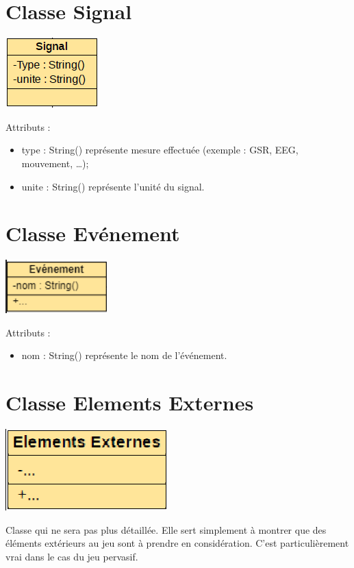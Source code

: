 \documentclass{article}
\begin{document}
	\section{Classe Signal}
		\begin{center}
			\includegraphics[scale=0.5]{include/Classe_Signal.PNG}\newline
		\end{center}
		Attributs :
		\begin{itemize}
			\item type : String() représente mesure effectuée (exemple : GSR, EEG, mouvement, …);
			\item unite : String() représente l’unité du signal.
		\end{itemize}

	\section{Classe Evénement}
		\begin{center}
			\includegraphics[scale=0.5]{include/Classe_Evenement.PNG}
		\end{center}
		Attributs :
		\begin{itemize}
			\item nom : String() représente le nom de l'événement.
		\end{itemize}

	\section{Classe Elements Externes}
		\begin{center}
			\includegraphics[scale=0.5]{include/Classe_Elements_Externes.PNG}\newline
		\end{center}
		Classe qui ne sera pas plus détaillée.
		Elle sert simplement à montrer que des éléments extérieurs au jeu sont à prendre en considération.
		C'est particulièrement vrai dans le cas du jeu pervasif.
\end{document}
